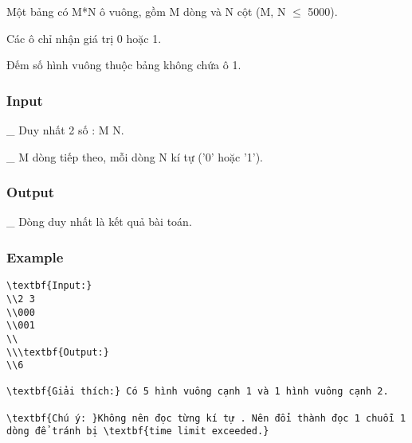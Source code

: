



   Một bảng có M*N ô vuông, gồm M dòng và N cột (M, N  $\le$  5000).  

   Các ô chỉ nhận giá trị 0 hoặc 1.  

   Đếm số hình vuông thuộc bảng không chứa ô 1.  

\subsubsection{   Input  }

   \_ Duy nhất 2 số : M N.  

   \_ M dòng tiếp theo, mỗi dòng N kí tự ('0' hoặc '1').  

\subsubsection{   Output  }

   \_ Dòng duy nhất là kết quả bài toán.  

\subsubsection{   Example  }
\begin{verbatim}
\textbf{Input:}
\\2 3
\\000
\\001
\\
\\\textbf{Output:}
\\6

\textbf{Giải thích:} Có 5 hình vuông cạnh 1 và 1 hình vuông cạnh 2.

\textbf{Chú ý: }Không nên đọc từng kí tự . Nên đổi thành đọc 1 chuỗi 1 dòng để tránh bị \textbf{time limit exceeded.}\end{verbatim}
